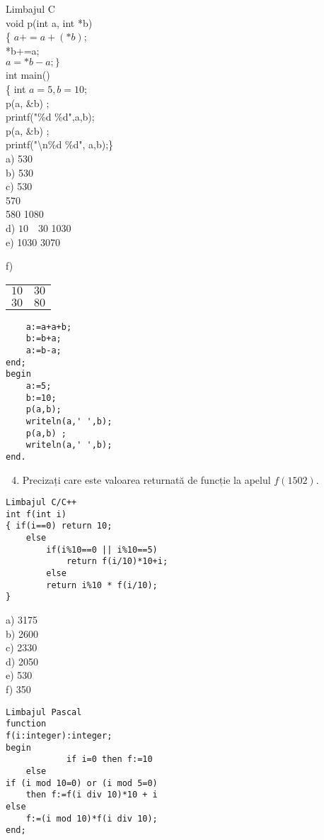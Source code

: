 Limbajul C\\
void p(int a, int *b)\\
\{ $a+=a+(* b)$;\\
*b+=a;\\
$a=* b-a ;\}$\\
int main()\\
\{ int $a=5, b=10$;\\
p(a, \&b) ;\\
printf("\%d \%d",a,b);\\
p(a, \&b) ;\\
printf("\textbackslash n\%d \%d", a,b);\}\\
a) 530\\
b) 530\\
c) 530\\
570\\
580 1080\\
d) $10 \quad 30$ 1030\\
e) 1030 3070

f) \begin{tabular}{l}
$10 \quad 30$ \\
$30 \quad 80$ \\
\end{tabular}

\begin{verbatim}
    a:=a+a+b;
    b:=b+a;
    a:=b-a;
end;
begin
    a:=5;
    b:=10;
    p(a,b);
    writeln(a,' ',b);
    p(a,b) ;
    writeln(a,' ',b);
end.
\end{verbatim}

\begin{enumerate}
  \setcounter{enumi}{3}
  \item Precizați care este valoarea returnată de funcție la apelul $f(1502)$.
\end{enumerate}

\begin{verbatim}
Limbajul C/C++
int f(int i)
{ if(i==0) return 10;
    else
        if(i%10==0 || i%10==5)
            return f(i/10)*10+i;
        else
        return i%10 * f(i/10);
}
\end{verbatim}

a) 3175\\
b) 2600\\
c) 2330\\
d) 2050\\
e) 530\\
f) 350

\begin{verbatim}
Limbajul Pascal
function
f(i:integer):integer;
begin
            if i=0 then f:=10
    else
if (i mod 10=0) or (i mod 5=0)
    then f:=f(i div 10)*10 + i
else
    f:=(i mod 10)*f(i div 10);
end;
\end{verbatim}

